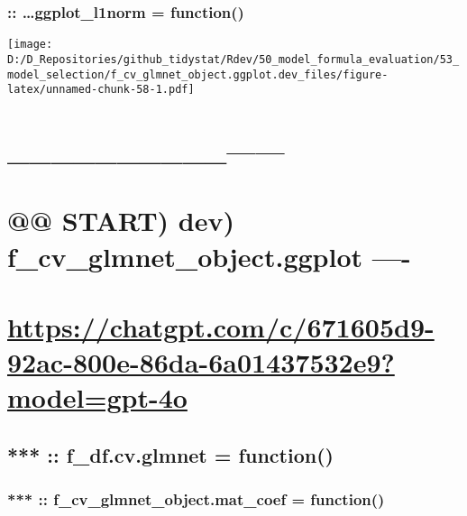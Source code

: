 \documentclass[
]{article}
\begin{document}
\hypertarget{ggplot_l1norm-function-2}{%
\subsubsection{:: \ldots ggplot\_l1norm =
function()}\label{ggplot_l1norm-function-2}}

\texttt{[image: D:/D\_Repositories/github\_tidystat/Rdev/50\_model\_formula\_evaluation/53\_model\_selection/f\_cv\_glmnet\_object.ggplot.dev\_files/figure-latex/unnamed-chunk-58-1.pdf]}

\hypertarget{section-3}{%
\section{\_\_\_\_\_\_\_\_\_\_\textbar------}\label{section-3}}

\hypertarget{start-dev-f_cv_glmnet_object.ggplot--}{%
\section{@@ START) dev) f\_cv\_glmnet\_object.ggplot
----}\label{start-dev-f_cv_glmnet_object.ggplot--}}

\hypertarget{httpschatgpt.comc671605d9-92ac-800e-86da-6a01437532e9modelgpt-4o}{%
\section{\texorpdfstring{\url{https://chatgpt.com/c/671605d9-92ac-800e-86da-6a01437532e9?model=gpt-4o}}{https://chatgpt.com/c/671605d9-92ac-800e-86da-6a01437532e9?model=gpt-4o}}\label{httpschatgpt.comc671605d9-92ac-800e-86da-6a01437532e9modelgpt-4o}}

\hypertarget{f_df.cv.glmnet-function}{%
\subsection{*** :: f\_df.cv.glmnet =
function()}\label{f_df.cv.glmnet-function}}

\hypertarget{f_cv_glmnet_object.mat_coef-function}{%
\subsubsection{*** :: f\_cv\_glmnet\_object.mat\_coef =
function()}\label{f_cv_glmnet_object.mat_coef-function}}
\end{document}

